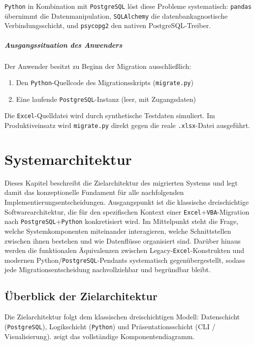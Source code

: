 ﻿\documentclass[12pt,a4paper]{report}
\theoremstyle{definition}
\theoremstyle{remark}
\newcommand{\excel}{\texttt{Excel}}
\newcommand{\vba}{\texttt{VBA}}
\newcommand{\pg}{\texttt{PostgreSQL}}
\newcommand{\py}{\texttt{Python}}
\newcommand{\pandas}{\texttt{pandas}}
\newcommand{\sqlalchemy}{\texttt{SQLAlchemy}}
\newcommand{\psycopg}{\texttt{psycopg2}}
\newcommand{\code}[1]{\texttt{#1}}
\begin{document}
\py{} in Kombination mit \pg{} l\"ost diese Probleme systematisch: \pandas{}
übernimmt die Datenmanipulation, \sqlalchemy{} die datenbankagnostische
Verbindungsschicht, und \psycopg{} den nativen PostgreSQL-Treiber.

\paragraph{Ausgangssituation des Anwenders}
Der Anwender besitzt zu Beginn der Migration ausschlie\ss{}lich:
\begin{enumerate}[leftmargin=1.5em, topsep=2pt]
  \item Den \py-Quellcode des Migrationsskripts (\code{migrate.py})
  \item Eine laufende \pg-Instanz (leer, mit Zugangsdaten)
\end{enumerate}
Die \excel-Quelldatei wird durch synthetische Testdaten simuliert.
Im Produktiveinsatz wird \code{migrate.py} direkt gegen die reale
\code{.xlsx}-Datei ausgeführt.

\chapter{Systemarchitektur}

Dieses Kapitel beschreibt die Zielarchitektur des migrierten Systems und legt damit das konzeptionelle Fundament für alle nachfolgenden Implementierungsentscheidungen. Ausgangspunkt ist die klassische dreischichtige Softwarearchitektur, die für den spezifischen Kontext einer \excel{}+\vba{}-Migration nach \pg{}+\py{} konkretisiert wird. Im Mittelpunkt steht die Frage, welche Systemkomponenten miteinander interagieren, welche Schnittstellen zwischen ihnen bestehen und wie Datenflüsse organisiert sind. Darüber hinaus werden die funktionalen Äquivalenzen zwischen Legacy-\excel-Konstrukten und modernen Python/\pg{}-Pendants systematisch gegenübergestellt, sodass jede Migrationsentscheidung nachvollziehbar und begründbar bleibt.

\section{Überblick der Zielarchitektur}
Die Zielarchitektur folgt dem klassischen dreischichtigen Modell:
Datenschicht (\pg), Logikschicht (\py) und Präsentationsschicht
(CLI / Visualisierung).  zeigt das vollständige
Komponentendiagramm.
\end{document}
